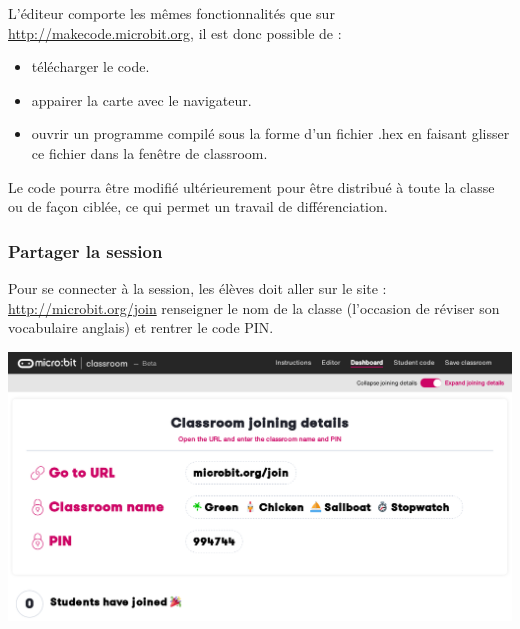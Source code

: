 \begin{remarque}
    L'éditeur comporte les mêmes fonctionnalités que sur \url{http://makecode.microbit.org}, il est donc possible de :
    \begin{itemize}
        \item télécharger le code.
        \item appairer la carte \mb avec le navigateur.
        \item ouvrir un programme compilé sous la forme d'un fichier .hex en faisant glisser ce fichier
        dans la fenêtre de classroom.
        
    \end{itemize}
    
    Le code pourra être modifié ultérieurement pour être distribué à toute la classe ou de façon ciblée,
     ce qui permet un travail de différenciation.
 
\end{remarque}

\vspace{5mm}

\subsubsection{Partager la session}

\begin{methode}
    Pour se connecter à la session, les élèves doit aller sur le site :  \url{http://microbit.org/join}
     renseigner le nom de la classe (l'occasion de réviser son vocabulaire anglais)
    et rentrer le code PIN.
    \vspace{5mm}

    \centerline{\includegraphics[width=0.7\linewidth]{res/classroom_dashboard2.png}}
    
\end{methode}


\newpage
\vspace{5mm}~\\

